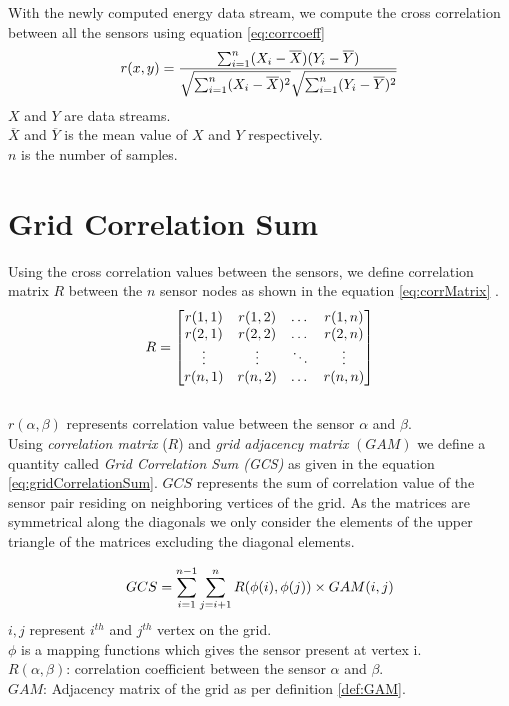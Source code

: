 With the newly computed energy data stream, we compute the cross correlation between all the sensors using equation \ref{eq:corrcoeff}
\begin{equation}
\label{eq:corrcoeff}
r(x,y)=\frac{\sum_{i=1}^{n}(X_i-\overline{X})(Y_i-\overline{Y})}{\sqrt{\sum_{i=1}^{n}(X_i-\overline{X})^2}\sqrt{\sum_{i=1}^{n}(Y_i-\overline{Y})^2}} \\
\end{equation}
$X$ and $Y$ are data streams.\\
$\overline{X}$ and $\overline{Y}$ is the mean value of $X$ and $Y$ respectively.\\
$n$ is the number of samples.\\

\section{Grid Correlation Sum}
\label{sec:gcs}
Using the cross correlation values between the sensors, we define correlation matrix $R$ between the $n$ sensor nodes as shown in the equation \ref{eq:corrMatrix} .
\begin{equation}
\label{eq:corrMatrix}
\centering
R = 
\begin{bmatrix}
    r(1,1) & r(1,2) & \dots  & r(1,n) \\
    r(2,1) & r(2,2)  & \dots  & r(2,n) \\
    \vdots & \vdots  & \ddots & \vdots \\
    r(n,1) & r(n,2)  & \dots  & r(n,n)
\end{bmatrix}
\end{equation}\\
$r(\alpha,\beta)$ represents correlation value between the sensor $\alpha$ and $\beta$.\\

Using \textit{correlation matrix} ($R$) and \textit{grid adjacency matrix} $(GAM)$ we define a quantity called \textit{Grid Correlation Sum (GCS)} as given in the equation \ref{eq:gridCorrelationSum}. $GCS$ represents the sum of correlation value of the sensor pair residing on neighboring vertices of the grid.
As the matrices are symmetrical along the diagonals we only consider the elements of the upper triangle of the matrices excluding the diagonal elements. 

\begin{equation}
\centering
GCS=\sum_{i=1}^{n-1}\sum_{j=i+1}^{n} R(\phi(i),\phi(j))  \times GAM(i,j)
\label{eq:gridCorrelationSum}
\end{equation}
$i,j$ represent $ i^{th}$ and $ j^{th}$ vertex on the grid.\\
$\phi$ is a mapping functions which gives the sensor present at vertex i.\\
$R(\alpha,\beta)$: correlation coefficient between the sensor $\alpha$ and $\beta$.\\
$GAM$:  Adjacency matrix of the grid as per definition \ref{def:GAM}.\\

